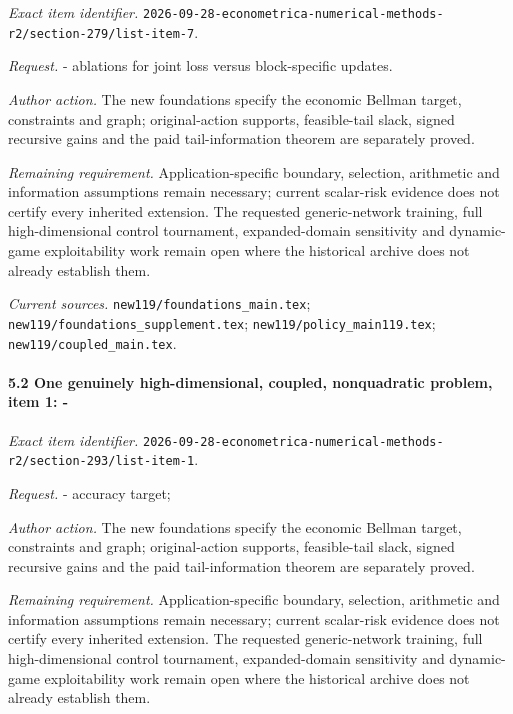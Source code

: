 \emph{Exact item identifier.} \nolinkurl{2026-09-28-econometrica-numerical-methods-r2/section-279/list-item-7}.

\par\emph{Request.} - ablations for joint loss versus block-specific updates.

\par\emph{Author action.} The new foundations specify the economic Bellman target, constraints and graph; original-action supports, feasible-tail slack, signed recursive gains and the paid tail-information theorem are separately proved.

\par\emph{Remaining requirement.} Application-specific boundary, selection, arithmetic and information assumptions remain necessary; current scalar-risk evidence does not certify every inherited extension. The requested generic-network training, full high-dimensional control tournament, expanded-domain sensitivity and dynamic-game exploitability work remain open where the historical archive does not already establish them.

\par\emph{Current sources.} \nolinkurl{new119/foundations_main.tex}; \nolinkurl{new119/foundations_supplement.tex}; \nolinkurl{new119/policy_main119.tex}; \nolinkurl{new119/coupled_main.tex}.

\paragraph{5.2 One genuinely high-dimensional, coupled, nonquadratic problem, item 1: -}

\emph{Exact item identifier.} \nolinkurl{2026-09-28-econometrica-numerical-methods-r2/section-293/list-item-1}.

\par\emph{Request.} - accuracy target;

\par\emph{Author action.} The new foundations specify the economic Bellman target, constraints and graph; original-action supports, feasible-tail slack, signed recursive gains and the paid tail-information theorem are separately proved.

\par\emph{Remaining requirement.} Application-specific boundary, selection, arithmetic and information assumptions remain necessary; current scalar-risk evidence does not certify every inherited extension. The requested generic-network training, full high-dimensional control tournament, expanded-domain sensitivity and dynamic-game exploitability work remain open where the historical archive does not already establish them.

